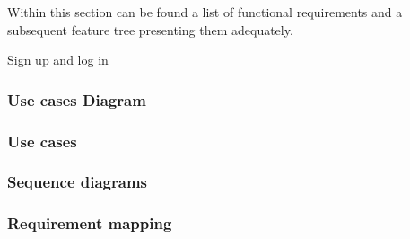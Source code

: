 Within this section can be found a list of functional requirements and a subsequent feature tree presenting them adequately. 

Sign up and log in



\subsubsection{Use cases Diagram}
\subsubsection{Use cases}
\subsubsection{Sequence diagrams}
\subsubsection{Requirement mapping}
